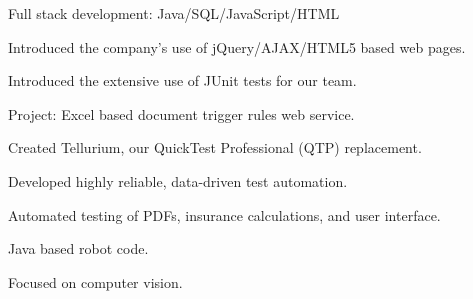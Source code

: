 \documentclass[letterpaper]{deedy-resume} %
\begin{document}
\begin{minipage}[t]{0.64\textwidth}
\sectionspace %

\vspace{\topsep} %
Full stack development: Java/SQL/JavaScript/HTML
\begin{tightitemize}
\item Introduced the company's use of jQuery/AJAX/HTML5 based web pages.
\item Introduced the extensive use of JUnit tests for our team.
\item Project: Excel based document trigger rules web service.
\end{tightitemize}

\sectionspace %



\vspace{\topsep} %
Created Tellurium, our QuickTest Professional (QTP) replacement.
\begin{tightitemize}
\item Developed highly reliable, data-driven test automation.
\item Automated testing of PDFs, insurance calculations, and user interface.
\end{tightitemize}

\sectionspace %


\vspace{\topsep} %



\begin{tightitemize}
\item Java based robot code.
\item Focused on computer vision. 
\end{tightitemize}
\vspace{\topsep} %


\end{minipage}
\end{document}
